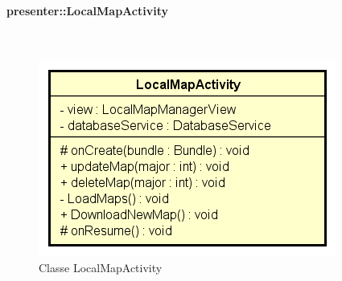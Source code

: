 \documentclass[../DefinizioneDiProdotto.tex]{subfiles}
\begin{document}
\paragraph{presenter::LocalMapActivity}
\
\begin{figure}[H]
	\centering
	\includegraphics[width=\maxwidth]{img/LocalMapActivity.png}
	\caption{Classe LocalMapActivity}\label{fig:presenter::LocalMapActivity} 
\end{figure}
\end{document}
